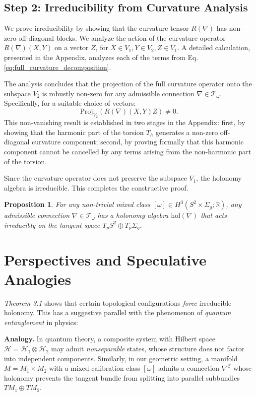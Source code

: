 \documentclass[12pt]{article}
\newtheorem{prop}{Proposition}[section]
\begin{document}
\subsection{Step 2: Irreducibility from Curvature Analysis}
We prove irreducibility by showing that the curvature tensor $R(\nabla)$ has non-zero off-diagonal blocks. We analyze the action of the curvature operator $R(\nabla)(X,Y)$ on a vector $Z$, for $X \in V_1, Y \in V_2, Z \in V_1$. A detailed calculation, presented in the Appendix, analyzes each of the terms from Eq. \eqref{eq:full_curvature_decomposition}.

The analysis concludes that the projection of the full curvature operator onto the subspace $V_2$ is robustly non-zero for any admissible connection $\nabla \in \mathcal{T}_\omega$. Specifically, for a suitable choice of vectors:
\[\mathrm{Proj}_{V_2} \left( R(\nabla)(X,Y)Z \right) \neq 0.\]
This non-vanishing result is established in two stages in the Appendix: first, by showing that the harmonic part of the torsion $T_h$ generates a non-zero off-diagonal curvature component; second, by proving formally that this harmonic component cannot be cancelled by any terms arising from the non-harmonic part of the torsion.

Since the curvature operator does not preserve the subspace $V_1$, the holonomy algebra is irreducible. This completes the constructive proof.

\begin{prop}
For any non-trivial mixed class $[\omega] \in H^3(S^2 \times \Sigma_g; \mathbb{R})$, any admissible connection $\nabla \in \mathcal{T}_\omega$ has a holonomy algebra $\mathrm{hol}(\nabla)$ that acts irreducibly on the tangent space $T_pS^2 \oplus T_p\Sigma_g$.
\end{prop}
\section{Perspectives and Speculative Analogies}

\textit{Theorem 3.1} shows that certain topological configurations \emph{force} irreducible holonomy.  
This has a suggestive parallel with the phenomenon of \emph{quantum entanglement} in physics:

\medskip
\noindent
\textbf{Analogy.}  
In quantum theory, a composite system with Hilbert space $\mathcal{H} = \mathcal{H}_1\otimes\mathcal{H}_2$ may admit \emph{nonseparable} states, whose structure does not factor into independent components.  
Similarly, in our geometric setting, a manifold $M=M_1\times M_2$ with a mixed calibration class $[\omega]$ admits a connection $\nabla^{\mathcal{C}}$ whose holonomy prevents the tangent bundle from splitting into parallel subbundles $TM_1\oplus TM_2$.
\end{document}
